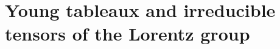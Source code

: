 \documentclass[12pt,preprintnumbers,nofootinbib]{revtex4}
\newcommand{\md}{\mathcal{D}}
\newcommand{\sul}{{{\rm SU}_{\rm L}(2)}}
\begin{document}
%
%


%
%
\newpage
\section{Young tableaux and irreducible tensors of the Lorentz group}
\label{young}
\end{document}
